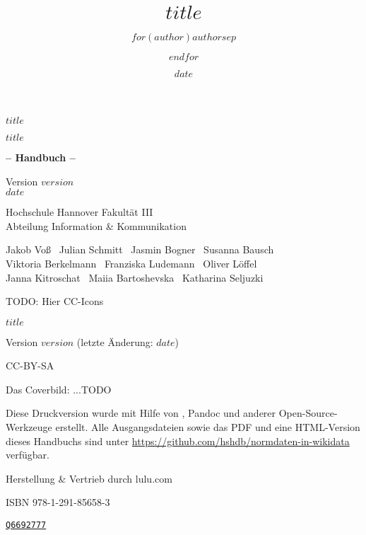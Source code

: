 \documentclass[
    a5paper,pagesize,
    10pt,
    DIV=12, %
    BCOR=2mm,
    open=any, %
    ngerman
]{scrbook}
\title{$title$}
\author{$for(author)$$author$$sep$ \and $endfor$}
\date{$date$}
\begin{document}
\thispagestyle{empty}
\begin{center}
\bfseries\sffamily\Large
\vspace{2cm}
$title$
\end{center}

\cleardoublepage

\thispagestyle{empty}
\begin{center}
\sffamily
\vspace{2cm}
{
  {\huge $title$}
  \vspace{0.5cm}
  
  {\bfseries\LARGE -- Handbuch -- }
  \vspace{0.5cm}

  Version $version$\\$date$
}
\vfill
{
  \large
  Hochschule Hannover Fakultät III\\
  Abteilung Information \& Kommunikation
}

Jakob Voß \textbar\ Julian Schmitt \textbar\ Jasmin Bogner \textbar\ Susanna Bausch \\
Viktoria Berkelmann \textbar\ Franziska Ludemann \textbar\ Oliver Löffel\\
Janna Kitroschat \textbar\ Maiia Bartoshevska \textbar\ Katharina Seljuzki

TODO: Hier CC-Icons

\end{center}

\pagebreak
\thispagestyle{empty}
\vspace*{\fill}
{
$title$

Version $version$ (letzte Änderung: $date$)

CC-BY-SA

Das Coverbild: ...TODO

Diese Druckversion wurde mit Hilfe von \XeTeX, Pandoc und anderer
Open-Source-Werkzeuge erstellt. Alle Ausgangsdateien sowie das PDF 
und eine HTML-Version dieses Handbuchs sind unter
\url{https://github.com/hshdb/normdaten-in-wikidata} verfügbar.

Herstellung \& Vertrieb durch lulu.com

ISBN 978-1-291-85658-3
}

\pagebreak
\thispagestyle{empty}
\begin{center}
\vspace*{3cm}
{\ttfamily \href{https://www.wikidata.org/wiki/Q6692777}{\texttt{Q6692777}}}
\end{center}
\end{document}
